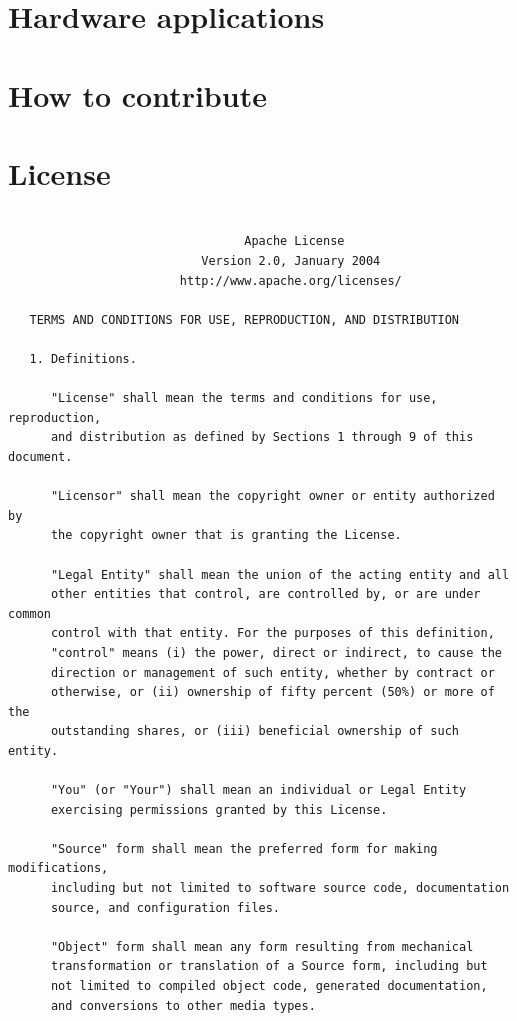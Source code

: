 \documentclass{book}
\begin{document}
\chapter{Hardware applications}


\chapter{How to contribute}

\chapter{License}

\begin{verbatim}

                                 Apache License
                           Version 2.0, January 2004
                        http://www.apache.org/licenses/

   TERMS AND CONDITIONS FOR USE, REPRODUCTION, AND DISTRIBUTION

   1. Definitions.

      "License" shall mean the terms and conditions for use, reproduction,
      and distribution as defined by Sections 1 through 9 of this document.

      "Licensor" shall mean the copyright owner or entity authorized by
      the copyright owner that is granting the License.

      "Legal Entity" shall mean the union of the acting entity and all
      other entities that control, are controlled by, or are under common
      control with that entity. For the purposes of this definition,
      "control" means (i) the power, direct or indirect, to cause the
      direction or management of such entity, whether by contract or
      otherwise, or (ii) ownership of fifty percent (50%) or more of the
      outstanding shares, or (iii) beneficial ownership of such entity.

      "You" (or "Your") shall mean an individual or Legal Entity
      exercising permissions granted by this License.

      "Source" form shall mean the preferred form for making modifications,
      including but not limited to software source code, documentation
      source, and configuration files.

      "Object" form shall mean any form resulting from mechanical
      transformation or translation of a Source form, including but
      not limited to compiled object code, generated documentation,
      and conversions to other media types.


\end{verbatim}
\end{document}
